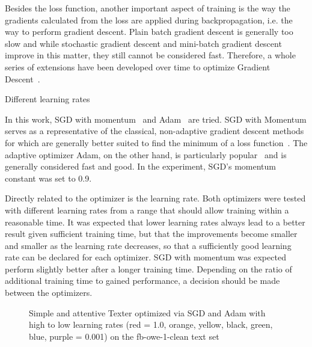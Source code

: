 Besides the loss function, another important aspect of training is the way the gradients calculated from the loss are applied during backpropagation, i.e. the way to perform gradient descent. Plain batch gradient descent is generally too slow and while stochastic gradient descent and mini-batch gradient descent improve in this matter, they still cannot be considered fast. Therefore, a whole series of extensions have been developed over time to optimize Gradient Descent~\cite{Ruder2016AnOO}.

\begin{table}[t]
    \centering
    
    \caption{Different learning rates}
    \label{tab:5_experiments/4_texter/2_static/8_optimizer/grid_search}
\end{table}

In this work, SGD with momentum~\cite{Qian1999OnTM} and Adam~\cite{Kingma2015AdamAM} are tried. SGD with Momentum serves as a representative of the classical, non-adaptive gradient descent methods for which are generally better suited to find the minimum of a loss function~\cite{Wilson2017TheMV}. The adaptive optimizer Adam, on the other hand, is particularly popular~\cite{AdamPopular} and is generally considered fast and good. In the experiment, SGD's momentum constant was set to 0.9.

Directly related to the optimizer is the learning rate. Both optimizers were tested with different learning rates from a range that should allow training within a reasonable time. It was expected that lower learning rates always lead to a better result given sufficient training time, but that the improvements become smaller and smaller as the learning rate decreases, so that a sufficiently good learning rate can be declared for each optimizer. SGD with momentum was expected perform slightly better after a longer training time. Depending on the ratio of additional training time to gained performance, a decision should be made between the optimizers.

\begin{figure}[t]
    \centering
    
    \caption{Simple and attentive Texter optimized via SGD and Adam with high to low learning rates (red = 1.0, orange, yellow, black, green, blue, purple = 0.001) on the fb-owe-1-clean text set}
    \label{fig:5_experiments/4_texter/2_static/8_optimizer/sgd_vs_adam/sgd_vs_adam}
\end{figure}

